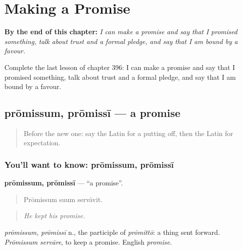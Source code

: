 
\chapter{Making a Promise}
\label{ch:la-making-a-promise}

\begin{chapteropening}
\textbf{By the end of this chapter:} \emph{I can make a promise and say that I promised something, talk about trust and a formal pledge, and say that I am bound by a favour.}

Complete the last lesson of chapter 396: I can make a promise and say that I promised something, talk about trust and a formal pledge, and say that I am bound by a favour.
\end{chapteropening}

\section[prōmissum, prōmissī]{prōmissum, prōmissī — a promise}

\label{lesson:LA-C396-promissum}



\begin{quote}
Before the new one: say the Latin for a putting off, then the Latin for expectation.
\end{quote}

\subsection*{You'll want to know: prōmissum, prōmissī}
\textbf{prōmissum, prōmissī} — \textquotedblleft{}a promise\textquotedblright{}.

\begin{quote}
Prōmissum suum servāvit.
\end{quote}

\begin{quote}
\emph{He kept his promise.}
\end{quote}

\emph{prōmissum, prōmissī} n., the participle of \emph{prōmittō}: a thing sent forward. \emph{Prōmissum servāre}, to keep a promise. English \emph{promise}.

